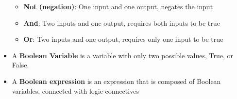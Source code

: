 \documentclass{report}
\begin{document}
\begin{itemize}
        \begin{itemize}
          \item \textbf{Not (negation)}: One input and one output, negates the input
          \item \textbf{And}: Two inputs and one output, requires both inputs to be true
          \item \textbf{Or}: Two inputs and one output, requires only one input to be true
        \end{itemize}
      \item  A \textbf{Boolean Variable} is a variable with only two possible values, True, or False.
      \item A \textbf{Boolean expression} is an expression that is composed of Boolean variables, connected with logic connectives
    \end{itemize}

    \pagebreak \bigbreak \noindent 
\end{document}
